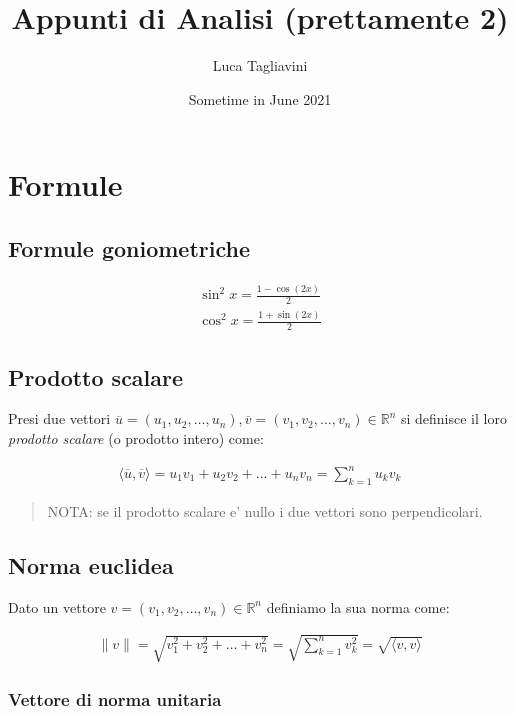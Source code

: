 \documentclass{article}
\title{Appunti di Analisi (prettamente 2)}
\author{Luca Tagliavini}
\date{Sometime in June 2021}
\begin{document}
\maketitle
\tableofcontents
\pagebreak

\section{Formule}

\subsection{Formule goniometriche}

\begin{align*}
  \sin^2 x = \frac{1-\cos(2x)}{2} \\
  \cos^2 x = \frac{1+\sin(2x)}{2}
\end{align*}

\subsection{Prodotto scalare}

Presi due vettori $\overline{u} = (u_1, u_2, \ldots, u_n), \overline{v} = (v_1, v_2, \ldots, v_n) \in \mathbb{R}^n$
si definisce il loro \emph{prodotto scalare} (o prodotto intero) come:

\begin{align*}
  \langle \overline{u}, \overline{v} \rangle = u_1 v_1 + u_2 v_2 + \ldots + u_n v_n = \sum_{k=1}^n u_k v_k
\end{align*}

\begin{quote}
  NOTA: se il prodotto scalare e' nullo i due vettori sono perpendicolari.
\end{quote}

\subsection{Norma euclidea}

Dato un vettore $v = (v_1, v_2, \ldots, v_n) \in \mathbb{R}^n$ definiamo la sua 
norma come:

\begin{align*}
  \| v \| = \sqrt{v_1^2 + v_2^2 + \ldots + v_n^2} = \sqrt{\sum_{k=1}^n v_k^2} = \sqrt{\langle v, v \rangle}
\end{align*}

\subsubsection{Vettore di norma unitaria}
\end{document}
